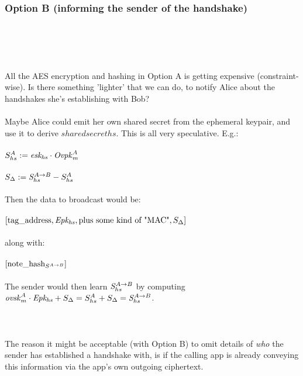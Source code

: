 \subsubsection{Option B (informing the sender of the handshake)}\hfill\\
\\
\\
\\
All the AES encryption and hashing in Option A is getting expensive (constraint-wise).
Is there something 'lighter' that we can do, to notify Alice about the handshakes she's establishing with Bob?\\
\\
Maybe Alice could emit her own shared secret from the ephemeral keypair, and use it to derive $sharedsecreths$.
This is all very speculative.
E.g.:\\
\\
$S_{hs}^A := \eskhs \cdot \Ovpkm^A$\\
\\
$S_{\Delta} := \sharedsecreths - S_{hs}^A$\\
\\
Then the data to broadcast would be:\\
\\
$[\text{tag\_address}, \Epkhs, \text{plus some kind of "MAC"}, S_{\Delta}]$\\
\\
along with:\\
\\
$[\sharedsecretnote]$\\
\\
The sender would then learn $\sharedsecreths$ by computing $\ovskm^A \cdot \Epkhs + S_{\Delta} = S_{hs}^A + S_{\Delta} = \sharedsecreths$.\\
\\
\\
\\
The reason it might be acceptable (with Option B) to omit details of \textit{who} the sender has established a handshake with, is if the calling app is already conveying this information via the app's own outgoing ciphertext.


